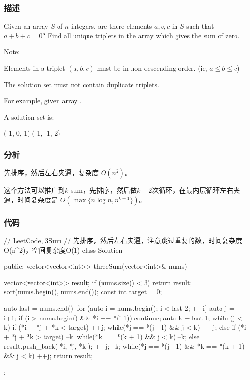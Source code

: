 \subsubsection{描述}
Given an array $S$ of $n$ integers, are there elements $a, b, c$ in $S$ such that $a + b + c = 0$? Find all unique triplets in the array which gives the sum of zero.

Note:
\begindot
\item Elements in a triplet $(a,b,c)$ must be in non-descending order. (ie, $a \leq b \leq c$)
\item The solution set must not contain duplicate triplets.
\myenddot

For example, given array .

A solution set is:
\begin{Code}
(-1, 0, 1)
(-1, -1, 2)
\end{Code}


\subsubsection{分析}
先排序，然后左右夹逼，复杂度 $O(n^2)$。

这个方法可以推广到$k$-sum，先排序，然后做$k-2$次循环，在最内层循环左右夹逼，时间复杂度是 $O(\max\{n \log n, n^{k-1}\})$。


\subsubsection{代码}
\begin{Code}
// LeetCode, 3Sum
// 先排序，然后左右夹逼，注意跳过重复的数，时间复杂度O(n^2)，空间复杂度O(1)
class Solution {
    public:
    vector<vector<int>> threeSum(vector<int>& nums) {
        vector<vector<int>> result;
        if (nums.size() < 3) return result;
        sort(nums.begin(), nums.end());
        const int target = 0;
		
        auto last = nums.end();
        for (auto i = nums.begin(); i < last-2; ++i) {
            auto j = i+1;
            if (i > nums.begin() && *i == *(i-1)) continue;
            auto k = last-1;
            while (j < k) {
                if (*i + *j + *k < target) {
                    ++j;
                    while(*j == *(j - 1) && j < k) ++j;
                } else if (*i + *j + *k > target) {
                    --k;
                    while(*k == *(k + 1) && j < k) --k;
                } else {
                    result.push_back({ *i, *j, *k });
                    ++j;
                    --k;
                    while(*j == *(j - 1) && *k == *(k + 1) && j < k) ++j;
                }
            }
        }
        return result;
    }
};
\end{Code}


